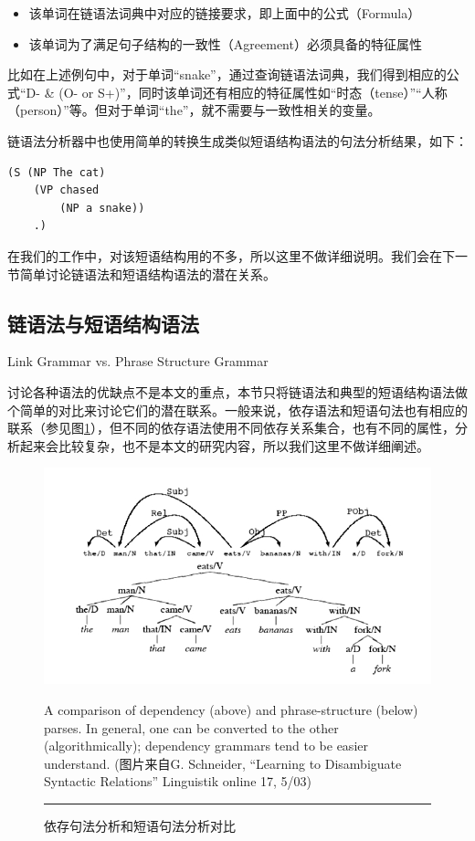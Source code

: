 \begin{itemize}
\item 该单词在链语法词典中对应的链接要求，即上面中的公式（Formula）
\item 该单词为了满足句子结构的一致性（Agreement）必须具备的特征属性
\end{itemize}

比如在上述例句中，对于单词“snake”，通过查询链语法词典，我们得到相应的公式“D- \& (O- or S+)”，同时该单词还有相应的特征属性如“时态（tense）”“人称（person）”等。但对于单词“the”，就不需要与一致性相关的变量。

链语法分析器中也使用简单的转换生成类似短语结构语法的句法分析结果，如下：

{\tt\begin{small}\begin{lstlisting}
(S (NP The cat)
	(VP chased
	 	(NP a snake))
 	.)
\end{lstlisting}\end{small}}

在我们的工作中，对该短语结构用的不多，所以这里不做详细说明。我们会在下一节简单讨论链语法和短语结构语法的潜在关系。

\subsection{链语法与短语结构语法}{Link Grammar vs. Phrase Structure Grammar}

讨论各种语法的优缺点不是本文的重点，本节只将链语法和典型的短语结构语法做个简单的对比来讨论它们的潜在联系。一般来说，依存语法和短语句法也有相应的联系（参见图\ref{fig:Dependency-and-Phrase-Structure}），但不同的依存语法使用不同依存关系集合，也有不同的属性，分析起来会比较复杂，也不是本文的研究内容，所以我们这里不做详细阐述。

\begin{figure}

\begin{centering}
\includegraphics[width=12cm]{figures/schneiderFigure1} 
\par\end{centering}

\caption{依存句法分析和短语句法分析对比\label{fig:Dependency-and-Phrase-Structure}}
A comparison of dependency (above) and phrase-structure (below) parses.
In general, one can be converted to the other (algorithmically); dependency
grammars tend to be easier understand.
(图片来自G. Schneider, ``Learning to Disambiguate Syntactic
Relations''  Linguistik online 17, 5/03)\\
 \rule[0.5ex]{1\columnwidth}{1pt} 
\end{figure}

